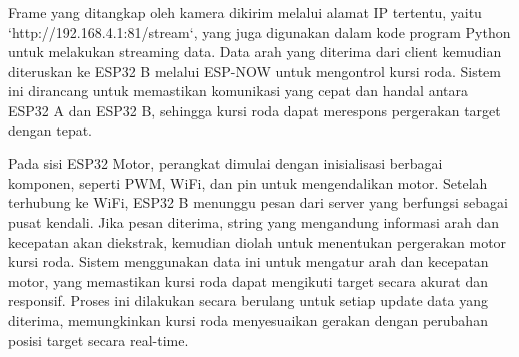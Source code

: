 Frame yang ditangkap oleh kamera dikirim melalui alamat IP tertentu, yaitu `http://192.168.4.1:81/stream`, yang juga digunakan dalam kode program Python untuk melakukan streaming data. Data arah yang diterima dari client kemudian diteruskan ke ESP32 B melalui ESP-NOW untuk mengontrol kursi roda. Sistem ini dirancang untuk memastikan komunikasi yang cepat dan handal antara ESP32 A dan ESP32 B, sehingga kursi roda dapat merespons pergerakan target dengan tepat.

Pada sisi ESP32 Motor, perangkat dimulai dengan inisialisasi berbagai komponen, seperti PWM, WiFi, dan pin untuk mengendalikan motor. Setelah terhubung ke WiFi, ESP32 B menunggu pesan dari server yang berfungsi sebagai pusat kendali. Jika pesan diterima, string yang mengandung informasi arah dan kecepatan akan diekstrak, kemudian diolah untuk menentukan pergerakan motor kursi roda. Sistem menggunakan data ini untuk mengatur arah dan kecepatan motor, yang memastikan kursi roda dapat mengikuti target secara akurat dan responsif. Proses ini dilakukan secara berulang untuk setiap update data yang diterima, memungkinkan kursi roda menyesuaikan gerakan dengan perubahan posisi target secara real-time.

